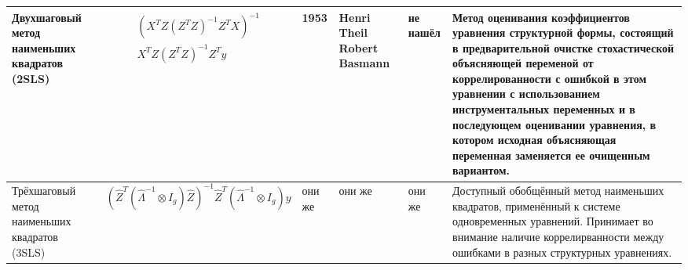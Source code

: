 \documentclass[10pt,a4paper]{article}
\begin{document}
\begin{table}
\begin{tabularx}{\textwidth}{|p{3cm}|X|X|X|X|p{9.5cm}|}
\hline
Двухшаговый метод наименьших квадратов (2SLS) & \begin{multline*} (X^T Z (Z^T Z)^{-1} Z^T X)^{-1} \\ X^T Z(Z^T Z)^{-1} Z^Ty \end{multline*} & 1953 \newline   1957 & Henri Theil \newline Robert Basmann & не нашёл  &  Метод оценивания коэффициентов уравнения структурной формы, состоящий в предварительной очистке стохастической объясняющей переменой от коррелированности с ошибкой в этом уравнении с использованием инструментальных переменных и в последующем оценивании уравнения, в котором исходная объясняющая переменная заменяется ее очищенным вариантом. \\
\hline
Трёхшаговый метод наименьших квадратов (3SLS) & \[ (\hat Z^T(\hat \Lambda^{-1} \otimes I_g) \hat Z)^{-1} \hat Z^T (\hat \Lambda^{-1} \otimes I_g)y \] & они же & они же & они же & Доступный обобщённый метод наименьших квадратов, применённый к системе одновременных уравнений. Принимает во внимание наличие коррелирванности между ошибками в разных структурных уравнениях. \\
\hline
\end{tabularx}
\end{table}
\end{document}
